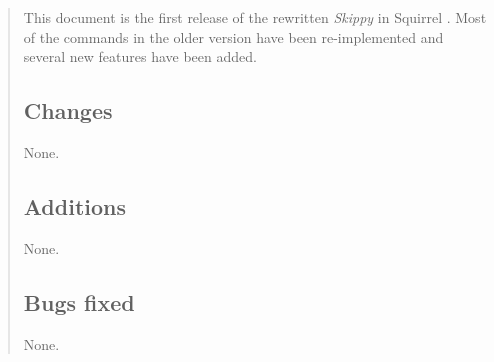 \documentclass[twoside,10pt,openany]{report}
\newcommand{\squirrel}{{\sc Squirrel} }
\newcounter{ex}[chapter]
\newcounter{sc}[chapter]
\begin{document}
\begin{quote}
This document is the first release of the rewritten {\it Skippy} in \squirrel. Most of the commands in the older version have been re-implemented and several new features have been added.

\subsection{Changes}

None.

\subsection{Additions}

None.

\subsection{Bugs fixed}

None.

 
 
\printindex
 
\end{quote} 
 
\end{document}
